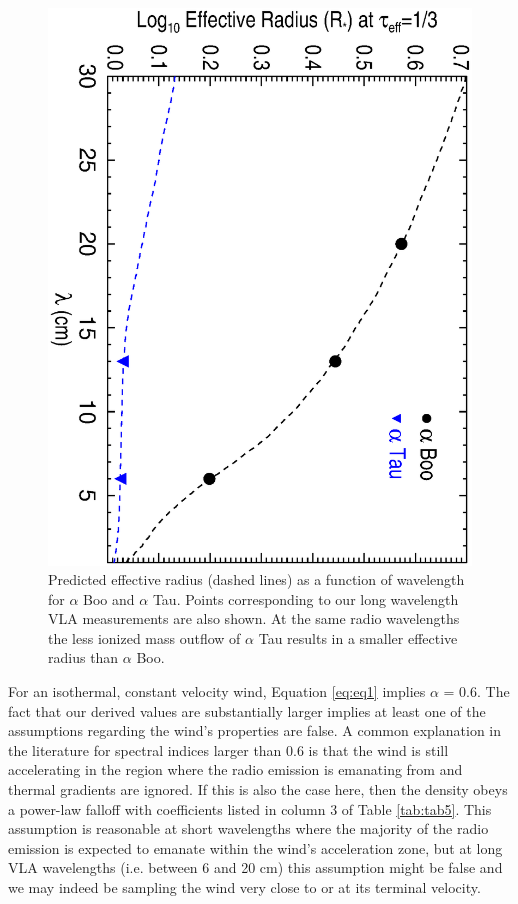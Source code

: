 \documentclass[iop]{emulateapj}
\begin{document}
\begin{figure}
\includegraphics[trim = 0mm 0mm 0mm 10mm, clip,scale=0.385,angle=90]{fig4.ps}
\caption{Predicted effective radius (dashed lines) as a function of wavelength for $\alpha$ Boo and $\alpha$ Tau. Points corresponding to our long wavelength VLA measurements are also shown.  At the same radio wavelengths the less ionized mass outflow of $\alpha$ Tau results in a smaller effective radius than $\alpha$ Boo.}
\label{fig:fig4}
\end{figure}

For an isothermal, constant velocity wind, Equation \ref{eq:eq1} implies $\alpha$ = 0.6. The fact that our derived values are substantially larger implies at least one of the assumptions regarding the wind's properties are false. A common explanation in the literature for spectral indices larger than 0.6 is that the wind is still accelerating in the region where the radio emission is emanating from and thermal gradients are ignored. If this is also the case here, then the density obeys a power-law falloff with coefficients listed in column 3 of Table \ref{tab:tab5}. This assumption is reasonable at short wavelengths where the majority of the radio emission is expected to emanate within the wind's acceleration zone, but at  long VLA wavelengths (i.e. between 6 and 20 cm) this assumption might be false and we may indeed be sampling the wind very close to or at its terminal velocity. 
\end{document}
